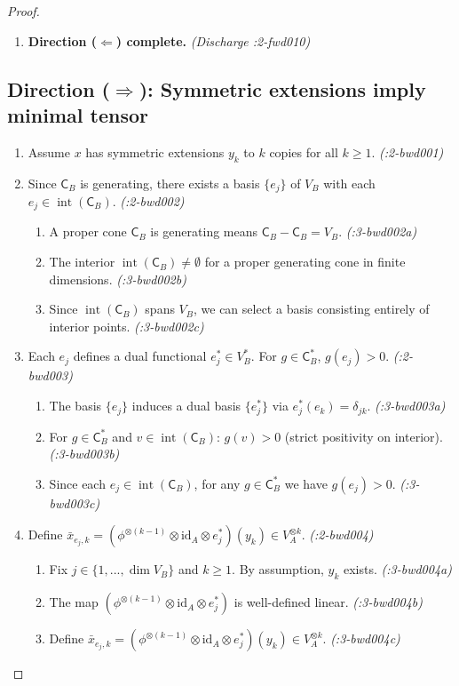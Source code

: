 \documentclass[11pt,a4paper]{article}
\theoremstyle{definition}
\theoremstyle{plain}
\newcommand{\proofstep}[2]{\item[$\langle #1 \rangle$#2.]}
\DeclareMathOperator{\inte}{int}
\newcommand{\C}{\mathsf{C}}
\begin{document}
\begin{proof}
\begin{enumerate}[leftmargin=2em]
\proofstep{1}{10} \textbf{Direction ($\Leftarrow$) complete.} \textit{(Discharge :2-fwd010)}
\end{enumerate}

\subsection*{Direction ($\Rightarrow$): Symmetric extensions imply minimal tensor}

\begin{enumerate}[leftmargin=2em]
\proofstep{1}{1} Assume $x$ has symmetric extensions $y_k$ to $k$ copies for all $k \geq 1$. \textit{(:2-bwd001)}

\proofstep{1}{2} Since $\C_B$ is generating, there exists a basis $\{e_j\}$ of $V_B$ with each $e_j \in \inte(\C_B)$. \textit{(:2-bwd002)}
\begin{enumerate}[leftmargin=1.5em, label=$\langle 2.\alph* \rangle$]
\item A proper cone $\C_B$ is generating means $\C_B - \C_B = V_B$. \textit{(:3-bwd002a)}
\item The interior $\inte(\C_B) \neq \emptyset$ for a proper generating cone in finite dimensions. \textit{(:3-bwd002b)}
\item Since $\inte(\C_B)$ spans $V_B$, we can select a basis consisting entirely of interior points. \textit{(:3-bwd002c)}
\end{enumerate}

\proofstep{1}{3} Each $e_j$ defines a dual functional $e_j^* \in V_B^*$. For $g \in \C_B^*$, $g(e_j) > 0$. \textit{(:2-bwd003)}
\begin{enumerate}[leftmargin=1.5em, label=$\langle 2.\alph* \rangle$]
\item The basis $\{e_j\}$ induces a dual basis $\{e_j^*\}$ via $e_j^*(e_k) = \delta_{jk}$. \textit{(:3-bwd003a)}
\item For $g \in \C_B^*$ and $v \in \inte(\C_B)$: $g(v) > 0$ (strict positivity on interior). \textit{(:3-bwd003b)}
\item Since each $e_j \in \inte(\C_B)$, for any $g \in \C_B^*$ we have $g(e_j) > 0$. \textit{(:3-bwd003c)}
\end{enumerate}

\proofstep{1}{4} Define $\bar{x}_{e_j,k} = (\phi^{\otimes(k-1)} \otimes \mathrm{id}_A \otimes e_j^*)(y_k) \in V_A^{\otimes k}$. \textit{(:2-bwd004)}
\begin{enumerate}[leftmargin=1.5em, label=$\langle 2.\alph* \rangle$]
\item Fix $j \in \{1, ..., \dim V_B\}$ and $k \geq 1$. By assumption, $y_k$ exists. \textit{(:3-bwd004a)}
\item The map $(\phi^{\otimes(k-1)} \otimes \mathrm{id}_A \otimes e_j^*)$ is well-defined linear. \textit{(:3-bwd004b)}
\item Define $\bar{x}_{e_j,k} = (\phi^{\otimes(k-1)} \otimes \mathrm{id}_A \otimes e_j^*)(y_k) \in V_A^{\otimes k}$. \textit{(:3-bwd004c)}
\end{enumerate}


\end{enumerate}
\end{proof}
\end{document}
